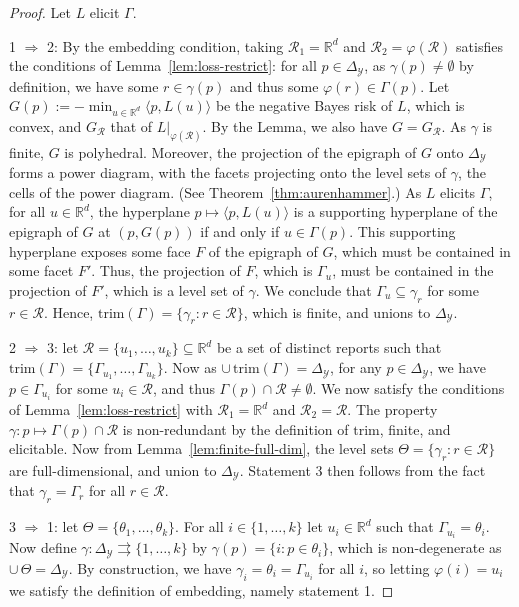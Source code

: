 \documentclass[11pt]{article}
\newcommand{\reals}{\mathbb{R}}
\newcommand{\simplex}{\Delta_\Y}
\newcommand{\R}{\mathcal{R}}
\newcommand{\Y}{\mathcal{Y}}
\newcommand{\inprod}[2]{\langle #1, #2 \rangle}%
\newcommand{\toto}{\rightrightarrows}
\newcommand{\trim}{\mathrm{trim}}
\begin{document}
\embedtrim*
\begin{proof}
  Let $L$ elicit $\Gamma$.

  1 $\Rightarrow$ 2:
  By the embedding condition, taking $\R_1 = \reals^d$ and $\R_2 = \varphi(\R)$ satisfies the conditions of Lemma~\ref{lem:loss-restrict}: for all $p\in\simplex$, as $\gamma(p) \neq \emptyset$ by definition, we have some $r\in\gamma(p)$ and thus some $\varphi(r) \in \Gamma(p)$.
  Let $G(p) := -\min_{u\in\reals^d} \inprod{p}{L(u)}$ be the negative Bayes risk of $L$, which is convex, and $G_{\R}$ that of $L|_{\varphi(\R)}$.
  By the Lemma, we also have $G = G_\R$.
  As $\gamma$ is finite, $G$ is polyhedral.
  Moreover, the projection of the epigraph of $G$ onto $\simplex$ forms a power diagram, with the facets projecting onto the level sets of $\gamma$, the cells of the power diagram.
  (See Theorem~\ref{thm:aurenhammer}.)
  As $L$ elicits $\Gamma$, for all $u\in\reals^d$, the hyperplane $p\mapsto \inprod{p}{L(u)}$ is a supporting hyperplane of the epigraph of $G$ at $(p,G(p))$ if and only if $u\in\Gamma(p)$.
  This supporting hyperplane exposes some face $F$ of the epigraph of $G$, which must be contained in some facet $F'$.
  Thus, the projection of $F$, which is $\Gamma_u$, must be contained in the projection of $F'$, which is a level set of $\gamma$.
  We conclude that $\Gamma_u \subseteq \gamma_r$ for some $r\in\R$.
  Hence, $\trim(\Gamma) = \{\gamma_r : r\in\R\}$, which is finite, and unions to $\simplex$.

  2 $\Rightarrow$ 3: let $\R = \{u_1,\ldots,u_k\} \subseteq\reals^d$ be a set of distinct reports such that $\trim(\Gamma) = \{\Gamma_{u_1},\ldots,\Gamma_{u_k}\}$.
  Now as $\cup\,\trim(\Gamma) = \simplex$, for any $p\in\simplex$, we have $p\in\Gamma_{u_i}$ for some $u_i\in\R$, and thus $\Gamma(p) \cap \R \neq \emptyset$.
  We now satisfy the conditions of Lemma~\ref{lem:loss-restrict} with $\R_1 = \reals^d$ and $\R_2 = \R$.
  The property $\gamma:p\mapsto\Gamma(p)\cap\R$ is non-redundant by the definition of $\trim$, finite, and elicitable.
  Now from Lemma~\ref{lem:finite-full-dim}, the level sets $\Theta = \{\gamma_r:r\in\R\}$ are full-dimensional, and union to $\simplex$.
  Statement 3 then follows from the fact that $\gamma_r = \Gamma_r$ for all $r\in\R$.

  3 $\Rightarrow$ 1: let $\Theta = \{\theta_1,\ldots,\theta_k\}$.
  For all $i\in\{1,\ldots,k\}$ let $u_i\in\reals^d$ such that $\Gamma_{u_i} = \theta_i$.
  Now define $\gamma:\simplex\toto\{1,\ldots,k\}$ by $\gamma(p) = \{i : p\in\theta_i\}$, which is non-degenerate as $\cup\,\Theta = \simplex$.
  By construction, we have $\gamma_i = \theta_i = \Gamma_{u_i}$ for all $i$, so letting $\varphi(i) = u_i$ we satisfy the definition of embedding, namely statement 1.
\end{proof}
\end{document}
